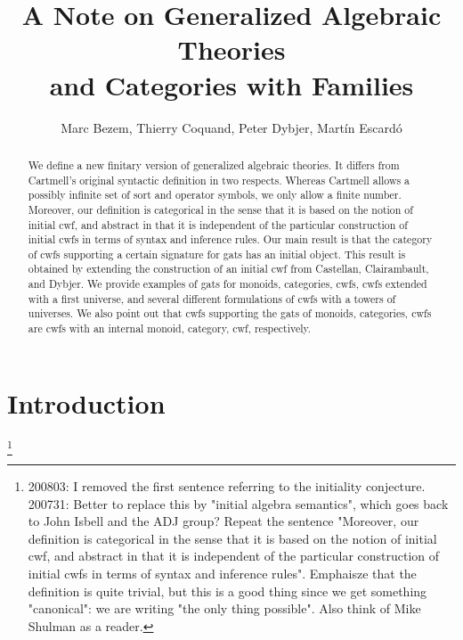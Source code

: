 \documentclass{lmcs}
\title[Generalized Algebraic Theories and Categories with Families]{A Note on Generalized Algebraic Theories\\and Categories with Families}\author{Marc Bezem, Thierry Coquand, Peter Dybjer, Mart\'in Escard\'o}
\begin{document}
\maketitle

\begin{abstract}
We define a new finitary version of generalized algebraic theories. It differs from Cartmell's original syntactic definition in two respects. Whereas Cartmell allows a possibly infinite set of sort and operator symbols, we only allow a finite number. Moreover, our definition is categorical in the sense that it is based on the notion of initial cwf, and abstract in that it is independent of the particular construction of initial cwfs in terms of syntax and inference rules. 
Our main result is that the category of cwfs supporting a certain signature for gats has an initial object. This result is obtained by extending the construction of an initial cwf from Castellan, Clairambault, and Dybjer. We provide examples of gats for monoids, categories, cwfs, cwfs extended with a first universe, and several different formulations of cwfs with a towers of universes. We also point out that cwfs supporting the gats of monoids, categories, cwfs are cwfs with an internal monoid, category, cwf, respectively.
\end{abstract}

\section{Introduction}

\footnote{200803: I removed the first sentence referring to the initiality conjecture. 200731: Better to replace this by "initial algebra semantics", which goes back to John Isbell and the ADJ group? Repeat the sentence "Moreover, our definition is categorical in the sense that it is based on the notion of initial cwf, and abstract in that it is independent of the particular construction of initial cwfs in terms of syntax and inference rules". Emphaisze that the definition is quite trivial, but this is a good thing since we get something "canonical": we are writing "the only thing possible". Also think of Mike Shulman as a reader.}
\end{document}
